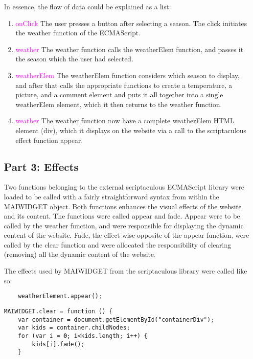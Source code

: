 \documentclass[a4paper,10pt]{article}
\begin{document}
In essence, the flow of data could be explained as a list:
\begin{enumerate}
	\item \textcolor{magenta}{onClick} The user presses a button after selecting a season. The click initiates the weather function of the ECMAScript.
	\item \textcolor{magenta}{weather} The weather function calls the weatherElem function, and passes it the season which the user had selected.
	\item \textcolor{magenta}{weatherElem} The weatherElem function considers which season to display, and after that calls the appropriate functions to create a temperature, a picture, and a comment element and puts it all together into a single weatherElem element, which it then returns to the weather function.
	\item \textcolor{magenta}{weather} The weather function now have a complete weatherElem HTML element (div), which it displays on the website via a call to the scriptaculous effect function appear.
\end{enumerate}

\subsection{Part 3: Effects}
Two functions belonging to the external scriptaculous ECMAScript library were loaded to be called with a fairly straightforward syntax from within the MAIWIDGET object. Both functions enhances the visual effects of the website and its content. The functions were called appear and fade. Appear were to be called by the weather function, and were responsible for displaying the dynamic content of the website. Fade, the effect-wise opposite of the appear function, were called by the clear function and were allocated the responsibility of clearing (removing) all the dynamic content of the website. 

The effects used by MAIWIDGET from the scriptaculous library were called like so:
\begin{verbatim}
    weatherElement.appear();
\end{verbatim}

\begin{verbatim}
MAIWIDGET.clear = function () {
    var container = document.getElementById("containerDiv");
    var kids = container.childNodes;
    for (var i = 0; i<kids.length; i++) {
        kids[i].fade();
    }
\end{verbatim}
\end{document}

